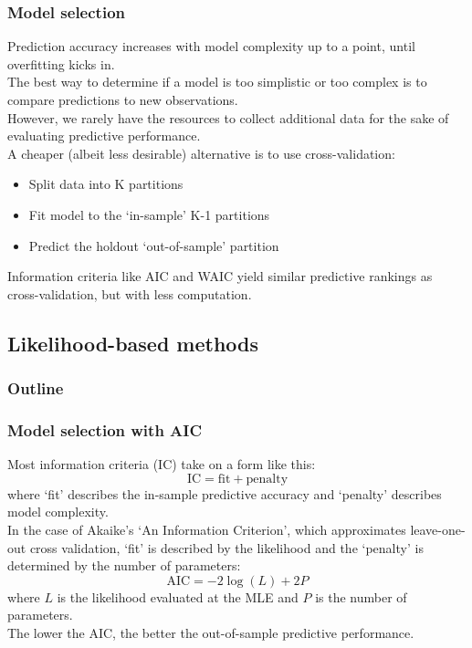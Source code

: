 \documentclass[color=usenames,dvipsnames]{beamer}\usepackage[]{graphicx}\usepackage[]{color}
\begin{document}
\begin{frame}
  \frametitle{Model selection}
  Prediction accuracy increases with model complexity up to a point,
  until overfitting kicks in. \\
  \pause
  \vfill
  The best way to determine if a model is too simplistic or too
  complex is to compare predictions to new observations. \\
  \pause
  \vfill
  However, we rarely have the resources to
  collect additional data for the sake of evaluating predictive
  performance. \\ 
  \pause
  \vfill
  A cheaper (albeit less desirable) alternative is to use
  cross-validation: 
  \begin{itemize}
    \item Split data into K partitions
    \item Fit model to the `in-sample' K-1 partitions
    \item Predict the holdout `out-of-sample' partition
  \end{itemize}
  \pause
  \vfill
  Information criteria like AIC and WAIC yield similar predictive
  rankings as cross-validation, but with less computation.    
\end{frame}



\subsection{Likelihood-based methods}



\begin{frame}
  \frametitle{Outline}
  \Large
\end{frame}





\begin{frame}
  \frametitle{Model selection with AIC}
  \small
  Most information criteria (IC) take on a form like this:
  \[
     \mathrm{IC} = \mathrm{fit} + \mathrm{penalty}
  \]
  where `fit' describes the \alert{in-sample} predictive accuracy and 
  `penalty' describes model complexity. \\
  \pause
  \vfill
  In the case of Akaike's `An Information Criterion', which
  approximates leave-one-out cross validation, `fit' is described by
  the likelihood and the `penalty' is determined by the number of parameters:
  \[
     \mathrm{AIC} = -2 \log(L) + 2P 
   \]
   where $L$ is the likelihood evaluated at the MLE and $P$ is
   the number of parameters. \\
   \pause
   \vfill
   The lower the AIC, the better the \alert{out-of-sample} predictive
   performance.
\end{frame}
\end{document}
